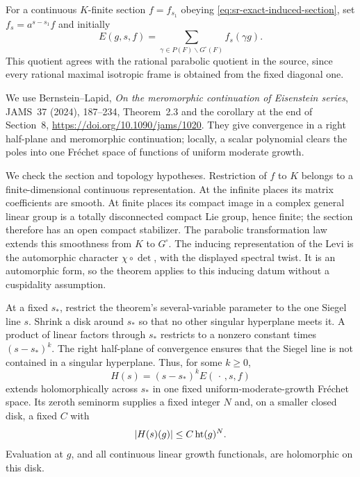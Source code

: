 For a continuous \(K\)-finite section \(f=f_{s_1}\) obeying
\eqref{eq:sr-exact-induced-section}, set
\(f_s=a^{s-s_1}f\) and initially
\[
                  E(g,s,f)
                     =\sum_{\gamma\in P(F)\backslash
                                  G^\square(F)}f_s(\gamma g).
\]
This quotient agrees with the rational parabolic quotient
in the source, since every rational maximal isotropic
frame is obtained from the fixed diagonal one.

We use Bernstein--Lapid, \emph{On the meromorphic
continuation of Eisenstein series}, JAMS~37 (2024), 187--234,
Theorem~2.3 and the corollary at the end of Section~8,
\url{https://doi.org/10.1090/jams/1020}.
They give convergence in a right half-plane and
meromorphic continuation; locally, a scalar polynomial
clears the poles into one Fr\'echet space of functions of
uniform moderate growth.

We check the section and topology hypotheses.
Restriction of \(f\) to \(K\) belongs to a finite-dimensional
continuous representation.
At the infinite places its matrix coefficients are smooth.
At finite places its compact image in a complex general
linear group is a totally disconnected compact Lie group,
hence finite; the section therefore has an open compact
stabilizer.
The parabolic transformation law extends this smoothness
from \(K\) to \(G^\square\).
The inducing representation of the Levi is the automorphic
character \(\chi\circ\det\), with the displayed spectral
twist.
It is an automorphic form, so the theorem applies to this
inducing datum without a cuspidality assumption.

At a fixed \(s_*\), restrict the theorem's several-variable
parameter to the one Siegel line \(s\).
Shrink a disk around \(s_*\) so that no other singular
hyperplane meets it.
A product of linear factors through \(s_*\) restricts to a
nonzero constant times \((s-s_*)^k\).
The right half-plane of convergence ensures that the
Siegel line is not contained in a singular hyperplane.
Thus, for some \(k\ge0\),
\[
                 H(s)=(s-s_*)^kE(\,\cdot\,,s,f)
\]
extends holomorphically across \(s_*\) in one fixed
uniform-moderate-growth Fr\'echet space.
Its zeroth seminorm supplies a fixed integer \(N\) and,
on a smaller closed disk, a fixed \(C\) with
\[
                     |H(s)(g)|\le C\,{\rm ht}(g)^N .
\]
Evaluation at \(g\), and all continuous linear growth
functionals, are holomorphic on this disk.

